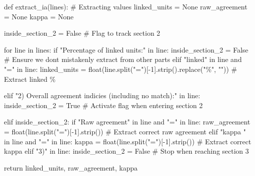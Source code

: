 \documentclass[
  letterpaper,
  DIV=11,
  numbers=noendperiod]{scrreprt}
\newenvironment{Shaded}{\begin{snugshade}}{\end{snugshade}}
\newcommand{\BuiltInTok}[1]{\textcolor[rgb]{0.00,0.23,0.31}{#1}}
\newcommand{\CommentTok}[1]{\textcolor[rgb]{0.37,0.37,0.37}{#1}}
\newcommand{\ControlFlowTok}[1]{\textcolor[rgb]{0.00,0.23,0.31}{#1}}
\newcommand{\DecValTok}[1]{\textcolor[rgb]{0.68,0.00,0.00}{#1}}
\newcommand{\KeywordTok}[1]{\textcolor[rgb]{0.00,0.23,0.31}{#1}}
\newcommand{\NormalTok}[1]{\textcolor[rgb]{0.00,0.23,0.31}{#1}}
\newcommand{\OperatorTok}[1]{\textcolor[rgb]{0.37,0.37,0.37}{#1}}
\newcommand{\StringTok}[1]{\textcolor[rgb]{0.13,0.47,0.30}{#1}}
\newcommand{\VariableTok}[1]{\textcolor[rgb]{0.07,0.07,0.07}{#1}}
\begin{document}
\begin{Shaded}
\begin{Highlighting}[]
\KeywordTok{def}\NormalTok{ extract\_ia(lines):}
    \CommentTok{\# Extracting values}
\NormalTok{    linked\_units }\OperatorTok{=} \VariableTok{None}
\NormalTok{    raw\_agreement }\OperatorTok{=} \VariableTok{None}
\NormalTok{    kappa }\OperatorTok{=} \VariableTok{None}

\NormalTok{    inside\_section\_2 }\OperatorTok{=} \VariableTok{False}  \CommentTok{\# Flag to track section 2}

    \ControlFlowTok{for}\NormalTok{ line }\KeywordTok{in}\NormalTok{ lines:}
        \ControlFlowTok{if} \StringTok{"Percentage of linked units:"} \KeywordTok{in}\NormalTok{ line:}
\NormalTok{            inside\_section\_2 }\OperatorTok{=} \VariableTok{False}  \CommentTok{\# Ensure we don\textquotesingle{}t mistakenly extract from other parts}
        \ControlFlowTok{elif} \StringTok{"linked"} \KeywordTok{in}\NormalTok{ line }\KeywordTok{and} \StringTok{"="} \KeywordTok{in}\NormalTok{ line:}
\NormalTok{            linked\_units }\OperatorTok{=} \BuiltInTok{float}\NormalTok{(line.split(}\StringTok{"="}\NormalTok{)[}\OperatorTok{{-}}\DecValTok{1}\NormalTok{].strip().replace(}\StringTok{"\%"}\NormalTok{, }\StringTok{""}\NormalTok{))  }\CommentTok{\# Extract linked \%}

        \ControlFlowTok{elif} \StringTok{"2) Overall agreement indicies (including no match):"} \KeywordTok{in}\NormalTok{ line:}
\NormalTok{            inside\_section\_2 }\OperatorTok{=} \VariableTok{True}  \CommentTok{\# Activate flag when entering section 2}

        \ControlFlowTok{elif}\NormalTok{ inside\_section\_2:}
            \ControlFlowTok{if} \StringTok{"Raw agreement"} \KeywordTok{in}\NormalTok{ line }\KeywordTok{and} \StringTok{"="} \KeywordTok{in}\NormalTok{ line:}
\NormalTok{                raw\_agreement }\OperatorTok{=} \BuiltInTok{float}\NormalTok{(line.split(}\StringTok{"="}\NormalTok{)[}\OperatorTok{{-}}\DecValTok{1}\NormalTok{].strip())  }\CommentTok{\# Extract correct raw agreement}
            \ControlFlowTok{elif} \StringTok{"kappa "} \KeywordTok{in}\NormalTok{ line }\KeywordTok{and} \StringTok{"="} \KeywordTok{in}\NormalTok{ line:}
\NormalTok{                kappa }\OperatorTok{=} \BuiltInTok{float}\NormalTok{(line.split(}\StringTok{"="}\NormalTok{)[}\OperatorTok{{-}}\DecValTok{1}\NormalTok{].strip())  }\CommentTok{\# Extract correct kappa}
            \ControlFlowTok{elif} \StringTok{"3)"} \KeywordTok{in}\NormalTok{ line:}
\NormalTok{                inside\_section\_2 }\OperatorTok{=} \VariableTok{False}  \CommentTok{\# Stop when reaching section 3}

    \ControlFlowTok{return}\NormalTok{ linked\_units, raw\_agreement, kappa}
\end{Highlighting}
\end{Shaded}
\end{document}
